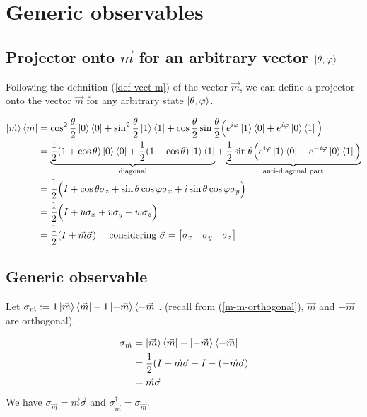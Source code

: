 \documentclass{article}
\begin{document}
\section{Generic observables}
\subsection{Projector onto $\vec{m}$ for an arbitrary vector $\ket{\theta, \varphi}$}

Following the definition (\ref{def-vect-m}) of the vector $\vec{m}$, we can define a projector onto
the vector $\vec{m}$ for any arbitrary state $\ket{\theta, \varphi}$.

\begin{equation}
    \begin{aligned}
        \ket{\vec{m}}\bra{\vec{m}}
            & = \cos^2\frac{\theta}{2}\ket{0}\bra{0}+\sin^2\frac{\theta}{2}\ket{1}\bra{1} +
                \cos\frac{\theta}{2}\sin\frac{\theta}{2}\Big(e^{i\varphi}\ket{1}\bra{0}+e^{i\varphi}\ket{0}\bra{1}\Big) \\
            & = \underbrace{\frac{1}{2}(1+\cos\theta)\ket{0}\bra{0}+ \frac{1}{2}(1-\cos\theta)\ket{1}\bra{1}}_{\text{diagonal}} +
                \underbrace{\frac{1}{2}\sin\theta \Big(e^{i\varphi}\ket{1}\bra{0}+e^{-i\varphi}\ket{0}\bra{1}\Big)}_{\text{anti-diagonal part}} \\
            & = \frac{1}{2}\Big(I + \cos\theta\sigma_z + \sin\theta\cos\varphi\sigma_x + i\sin\theta\cos\varphi\sigma_y \Big) \\
            & = \frac{1}{2}\Big(I + u\sigma_x + v\sigma_y + w\sigma_z \Big) \\
            & = \frac{1}{2}(I+\vec{m}\vec{\sigma})
                \quad \text{ considering } \vec{\sigma}=\begin{bmatrix}\sigma_x & \sigma_y & \sigma_z\end{bmatrix}
    \end{aligned}
\end{equation}

\subsection{Generic observable}
Let $\sigma_{\vec{m}}:=1\ket{\vec{m}}\bra{\vec{m}}-1\ket{-\vec{m}}\bra{-\vec{m}}$.
(recall from (\ref{m-m-orthogonal}), $\vec{m}$ and $-\vec{m}$ are orthogonal).

\begin{equation}
    \begin{aligned}
        \sigma_{\vec{m}}
            & = \ket{\vec{m}}\bra{\vec{m}}-\ket{-\vec{m}}\bra{-\vec{m}} \\
            & = \frac{1}{2}(I+\vec{m}\vec{\sigma}-I-(-\vec{m}\vec{\sigma}) \\
            & = \vec{m}\vec{\sigma}
    \end{aligned}
\end{equation}
\noindent
We have $\sigma_{\vec{m}}=\vec{m}\vec{\sigma}$ and $\sigma_{\vec{m}}^\dagger=\sigma_{\vec{m}}$.
\end{document}
